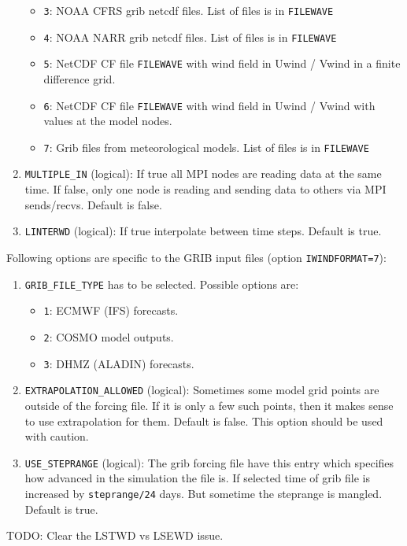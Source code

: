 \documentclass[12pt]{amsart}
\begin{document}
\begin{enumerate}
\begin{itemize}
  \item {\tt 3}: NOAA CFRS grib netcdf files. List of files is in {\tt FILEWAVE}
  \item {\tt 4}: NOAA NARR grib netcdf files. List of files is in {\tt FILEWAVE}
  \item {\tt 5}: NetCDF CF file {\tt FILEWAVE} with wind field in Uwind / Vwind in a finite difference grid.
  \item {\tt 6}: NetCDF CF file {\tt FILEWAVE} with wind field in Uwind / Vwind with values at the model nodes.
  \item {\tt 7}: Grib files from meteorological models. List of files is in {\tt FILEWAVE}
  \end{itemize}
\item {\tt MULTIPLE\_IN} (logical): If true all MPI nodes are reading data at the same time. If false, only one node is reading and sending data to others via MPI sends/recvs. Default is false.
\item {\tt LINTERWD} (logical): If true interpolate between time steps. Default is true.
\end{enumerate}
Following options are specific to the GRIB input files (option {\tt IWINDFORMAT=7}):
\begin{enumerate}
\item {\tt GRIB\_FILE\_TYPE} has to be selected. Possible options are:
  \begin{itemize}
  \item {\tt 1}: ECMWF (IFS) forecasts.
  \item {\tt 2}: COSMO model outputs.
  \item {\tt 3}: DHMZ (ALADIN) forecasts.
  \end{itemize}
\item {\tt EXTRAPOLATION\_ALLOWED} (logical): Sometimes some model grid points are outside of the forcing file. If it is only a few such points, then it makes sense to use extrapolation for them. Default is false. This option should be used with caution.
\item {\tt USE\_STEPRANGE} (logical): The grib forcing file have this entry which specifies how advanced in the simulation the file is. If selected time of grib file is increased by {\tt steprange/24} days. But sometime the steprange is mangled. Default is true.
\end{enumerate}

TODO: Clear the LSTWD vs LSEWD issue.
\end{document}
